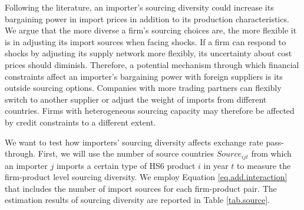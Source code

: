 Following the literature, an importer's sourcing diversity could increase its bargaining power in import prices in addition to its production characteristics. We argue that the more diverse a firm's sourcing choices are, the more flexible it is in adjusting its import sources when facing shocks. If a firm can respond to shocks by adjusting its supply network more flexibly, its uncertainty about cost prices should diminish. Therefore, a potential mechanism through which financial constraints affect an importer's bargaining power with foreign suppliers is its outside sourcing options. Companies with more trading partners can flexibly switch to another supplier or adjust the weight of imports from different countries. Firms with heterogeneous sourcing capacity may therefore be affected by credit constraints to a different extent. 

We want to test how importers' sourcing diversity affects exchange rate pass-through. First, we will use the number of source countries $Source_{ijt}$ from which an importer $j$ imports a certain type of HS6 product $i$ in year $t$ to measure the firm-product level sourcing diversity. We employ Equation \ref{eq.add.interaction} that includes the number of import sources for each firm-product pair. The estimation results of sourcing diversity are reported in Table \ref{tab.source}.

